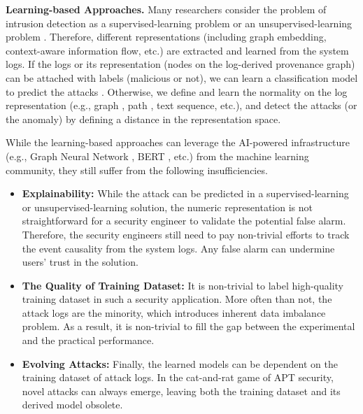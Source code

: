 \noindent\textbf{Learning-based Approaches.}
Many researchers consider the problem of intrusion detection as a supervised-learning problem \cite{liu2018towards,hassan2019nodoze,hassan2020we} or an unsupervised-learning problem \cite{wang2022threatrace,han2020unicorn,wang2020you}.
Therefore, different representations \cite{zeng2021watson, zengy2022shadewatcher} (including graph embedding, context-aware information flow, etc.) are extracted and learned from the system logs.
If the logs or its representation (nodes on the log-derived provenance graph) can be attached with labels (malicious or not),
we can learn a classification model to predict the attacks .
Otherwise, we define and learn the normality on the log representation (e.g., graph \cite{manzoor2016fast,han2020unicorn,li2021hierarchical,yang2023prographer,cheng2023kairos}, path \cite{wang2020you,alsaheel2021atlas}, text sequence, etc.), and detect the attacks (or the anomaly) by
defining a distance in the representation space.

While the learning-based approaches can leverage 
the AI-powered infrastructure (e.g., Graph Neural Network \cite{}, BERT \cite{xx}, etc.) from the machine learning community,
they still suffer from the following insufficiencies.

\begin{itemize}[leftmargin=*]
  \item \textbf{Explainability:}
    While the attack can be predicted in a supervised-learning or unsupervised-learning solution,
    the numeric representation is not straightforward for a security engineer to 
    validate the potential false alarm.
    Therefore, the security engineers still need to pay non-trivial efforts to 
    track the event causality from the system logs.
    Any false alarm can undermine users' trust in the solution.
  \item \textbf{The Quality of Training Dataset:}
    It is non-trivial to label high-quality training dataset in such a security application.
    More often than not, the attack logs are the minority, which introduces inherent data imbalance problem.
    As a result, it is non-trivial to fill the gap between the experimental and the practical performance.
  \item \textbf{Evolving Attacks:}
    Finally, the learned models can be dependent on the training dataset of attack logs.
    In the cat-and-rat game of APT security,
    novel attacks can always emerge, 
    leaving both the training dataset and its derived model obsolete.
\end{itemize}


